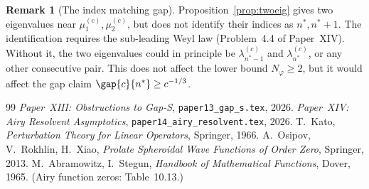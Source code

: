 \documentclass[12pt,a4paper]{amsart}
\theoremstyle{definition}
\newtheorem{remark}[theorem]{Remark}
\newcommand{\lam}[2]{\lambda_{#2}^{(#1)}}
\begin{document}
\begin{remark}[The index matching gap]\label{rem:matching}
Proposition~\ref{prop:twoeig} gives two eigenvalues near
$\mu_1^{(c)}, \mu_2^{(c)}$, but does not identify their indices
as $n^*, n^*+1$.
The identification requires the sub-leading Weyl law
(Problem~4.4 of Paper~XIV).
Without it, the two eigenvalues could in principle be
$\lam{c}{n^*-1}$ and $\lam{c}{n^*}$, or any other consecutive pair.
This does not affect the lower bound $N_\varphi \geq 2$,
but it would affect the gap claim $\gap{c}{n^*} \geq c^{-1/3}$.
\end{remark}

\begin{thebibliography}{99}
 \textit{Paper~XIII: Obstructions to Gap-S},
  \texttt{paper13\_gap\_s.tex}, 2026.
 \textit{Paper~XIV: Airy Resolvent Asymptotics},
  \texttt{paper14\_airy\_resolvent.tex}, 2026.
 T.~Kato, \textit{Perturbation Theory for Linear Operators},
  Springer, 1966.
 A.~Osipov, V.~Rokhlin, H.~Xiao,
  \textit{Prolate Spheroidal Wave Functions of Order Zero},
  Springer, 2013.
 M.~Abramowitz, I.~Stegun,
  \textit{Handbook of Mathematical Functions}, Dover, 1965.
  (Airy function zeros: Table~10.13.)
\end{thebibliography}
\end{document}
